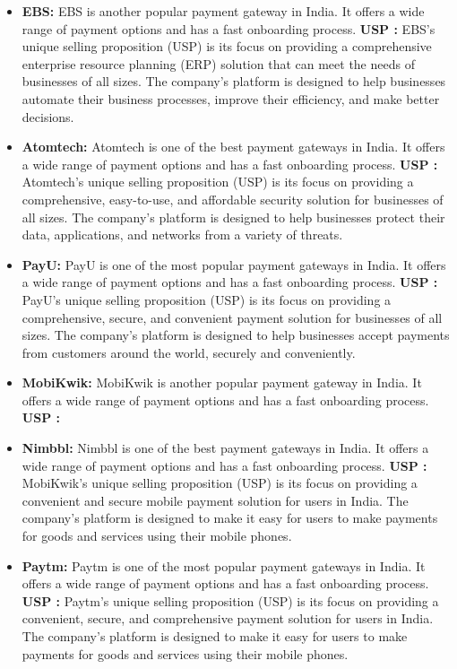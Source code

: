 \begin{enumerate}
\begin{itemize}
    \item \textbf{EBS:} EBS is another popular payment gateway in India. It offers a wide range of payment options and has a fast onboarding process.
    \textbf{USP : }EBS's unique selling proposition (USP) is its focus on providing a comprehensive enterprise resource planning (ERP) solution that can meet the needs of businesses of all sizes. The company's platform is designed to help businesses automate their business processes, improve their efficiency, and make better decisions.
    

    \item \textbf{Atomtech:} Atomtech is one of the best payment gateways in India. It offers a wide range of payment options and has a fast onboarding process.
    \textbf{USP : }Atomtech’s unique selling proposition (USP) is its focus on providing a comprehensive, easy-to-use, and affordable security solution for businesses of all sizes. The company’s platform is designed to help businesses protect their data, applications, and networks from a variety of threats.


    \item \textbf{PayU:} PayU is one of the most popular payment gateways in India. It offers a wide range of payment options and has a fast onboarding process.
    \textbf{USP : }PayU's unique selling proposition (USP) is its focus on providing a comprehensive, secure, and convenient payment solution for businesses of all sizes. The company's platform is designed to help businesses accept payments from customers around the world, securely and conveniently.


    \item \textbf{MobiKwik:} MobiKwik is another popular payment gateway in India. It offers a wide range of payment options and has a fast onboarding process.
    \textbf{USP : }
    \item \textbf{Nimbbl:} Nimbbl is one of the best payment gateways in India. It offers a wide range of payment options and has a fast onboarding process.
    \textbf{USP : }MobiKwik's unique selling proposition (USP) is its focus on providing a convenient and secure mobile payment solution for users in India. The company's platform is designed to make it easy for users to make payments for goods and services using their mobile phones.


    \item \textbf{Paytm:} Paytm is one of the most popular payment gateways in India. It offers a wide range of payment options and has a fast onboarding process.
    \textbf{USP : }Paytm's unique selling proposition (USP) is its focus on providing a convenient, secure, and comprehensive payment solution for users in India. The company's platform is designed to make it easy for users to make payments for goods and services using their mobile phones.



\end{itemize}
\end{enumerate}
